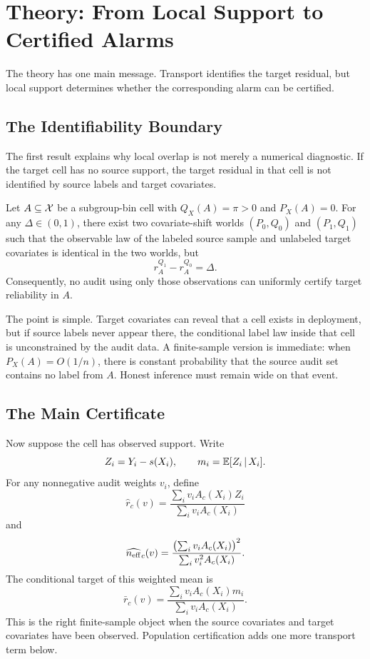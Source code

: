 \section{Theory: From Local Support to Certified Alarms}\label{sec:theory}

The theory has one main message. Transport identifies the target residual, but local support determines whether the corresponding alarm can be certified.

\subsection{The Identifiability Boundary}

The first result explains why local overlap is not merely a numerical diagnostic. If the target cell has no source support, the target residual in that cell is not identified by source labels and target covariates.

\begin{proposition}\label{prop:no-overlap}
Let \(A\subseteq\mathcal{X}\) be a subgroup-bin cell with \(Q_X(A)=\pi>0\) and \(P_X(A)=0\). For any \(\Delta\in(0,1)\), there exist two covariate-shift worlds \((P_0,Q_0)\) and \((P_1,Q_1)\) such that the observable law of the labeled source sample and unlabeled target covariates is identical in the two worlds, but
\[
r_A^{Q_1}-r_A^{Q_0}=\Delta .
\]
Consequently, no audit using only those observations can uniformly certify target reliability in \(A\).
\end{proposition}

The point is simple. Target covariates can reveal that a cell exists in deployment, but if source labels never appear there, the conditional label law inside that cell is unconstrained by the audit data. A finite-sample version is immediate: when \(P_X(A)=O(1/n)\), there is constant probability that the source audit set contains no label from \(A\). Honest inference must remain wide on that event.

\subsection{The Main Certificate}

Now suppose the cell has observed support. Write
\[
Z_i=Y_i-s(X_i),
\qquad
m_i=\mathbb{E}[Z_i\,|\, X_i].
\]
For any nonnegative audit weights \(v_i\), define
\[
\widehat r_c(v)
=
\frac{\sum_i v_iA_c(X_i)Z_i}{\sum_i v_iA_c(X_i)}
\]
and
\[
\widehat{n_{\mathrm{eff}}}_c(v)
=
\frac{\bigl(\sum_i v_iA_c(X_i)\bigr)^2}
{\sum_i v_i^2A_c(X_i)}.
\]
The conditional target of this weighted mean is
\[
\bar r_c(v)
=
\frac{\sum_i v_iA_c(X_i)m_i}{\sum_i v_iA_c(X_i)} .
\]
This is the right finite-sample object when the source covariates and target covariates have been observed. Population certification adds one more transport term below.

